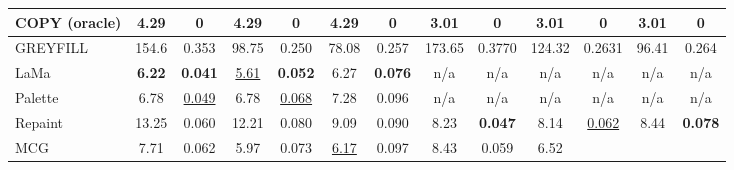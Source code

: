 \begin{table}[t]
\begin{tabular}{|l|c|c|c|c|c|c|c|c|c|c|c|c|}
    \rowcolor[gray]{0.7}
  COPY (oracle) &
    \multicolumn{1}{c|}{4.29} &
    \multicolumn{1}{c|}{0} &
    \multicolumn{1}{c|}{4.29} &
    \multicolumn{1}{c|}{0} &
    \multicolumn{1}{c|}{4.29} &
    \multicolumn{1}{c|}{0} &
    \multicolumn{1}{c|}{3.01} &
    \multicolumn{1}{c|}{0} &
    \multicolumn{1}{c|}{3.01} &
    \multicolumn{1}{c|}{0} &
    \multicolumn{1}{c|}{3.01} &
    \multicolumn{1}{c|}{0} \\ \hline
  GREYFILL &
    \multicolumn{1}{c|}{154.6} &
    \multicolumn{1}{c|}{0.353} &
    \multicolumn{1}{c|}{98.75} &
    \multicolumn{1}{c|}{0.250} &
    78.08 &
    0.257
    &
    \multicolumn{1}{c|}{173.65} &
    \multicolumn{1}{c|}{0.3770} &
    \multicolumn{1}{c|}{124.32} &
    \multicolumn{1}{c|}{0.2631} &
    96.41 &
    0.264
     \\ \Xhline{4\arrayrulewidth}
  LaMa&
    \multicolumn{1}{c|}{\textbf{6.22}} &
    \multicolumn{1}{c|}{\textbf{0.041}} &
    \multicolumn{1}{c|}{{\underline{5.61}}} &
    \multicolumn{1}{c|}{\textbf{0.052}} &
    6.27 &
    \textbf{0.076}
     &
    \multicolumn{1}{c|}{n/a} &
    \multicolumn{1}{c|}{n/a} &
    \multicolumn{1}{c|}{n/a} &
    \multicolumn{1}{c|}{n/a} &
    \multicolumn{1}{c|}{n/a} &
    \multicolumn{1}{c|}{n/a} \\ \hline
  Palette &
    \multicolumn{1}{c|}{6.78} &
    \multicolumn{1}{c|}{{\underline{0.049}}} &
    \multicolumn{1}{c|}{6.78} &
    \multicolumn{1}{c|}{{\underline{0.068}}} &
    \multicolumn{1}{c|}{7.28} &
    \multicolumn{1}{c|}{0.096}
    &
    \multicolumn{1}{c|}{n/a} &
    \multicolumn{1}{c|}{n/a} &
    \multicolumn{1}{c|}{n/a} &
    \multicolumn{1}{c|}{n/a} &
    \multicolumn{1}{c|}{n/a} &
    \multicolumn{1}{c|}{n/a} \\ \Xhline{4\arrayrulewidth}
  Repaint &
    \multicolumn{1}{c|}{13.25} &
    \multicolumn{1}{c|}{0.060} &
    \multicolumn{1}{c|}{12.21} &
    \multicolumn{1}{c|}{0.080} &
    \multicolumn{1}{c|}{9.09} &
    \multicolumn{1}{c|}{0.090} &
    \multicolumn{1}{c|}{8.23} &
    \multicolumn{1}{c|}{\textbf{0.047}} &
    \multicolumn{1}{c|}{8.14} &
    \multicolumn{1}{c|}{\underline{0.062}} &
    \multicolumn{1}{c|}{8.44} &
    \multicolumn{1}{c|}{\textbf{0.078}}  \\ \hline
  MCG &
    \multicolumn{1}{c|}{7.71} &
    \multicolumn{1}{c|}{0.062} &
    \multicolumn{1}{c|}{5.97} &
    \multicolumn{1}{c|}{0.073} &
    \multicolumn{1}{c|}{\underline{6.17}} &
    \multicolumn{1}{c|}{0.097}
    &
    \multicolumn{1}{c|}{8.43} &
    \multicolumn{1}{c|}{0.059} &
    \multicolumn{1}{c|}{6.52} &

\end{tabular}
\end{table}
